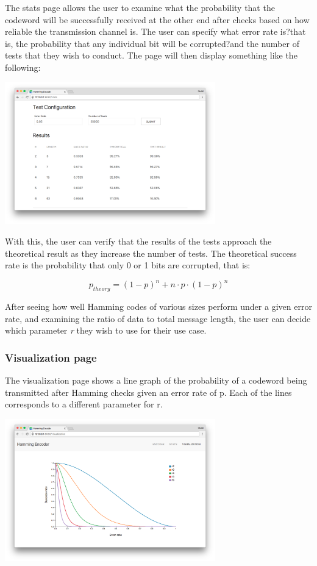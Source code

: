 \documentclass[11pt, oneside]{article}   	%
\begin{document}
The stats page allows the user to examine what the probability that the codeword will be successfully received at the other end after checks based on how reliable the transmission channel is. The user can specify what error rate is?that is, the probability that any individual bit will be corrupted?and the number of tests that they wish to conduct. The page will then display something like the following:

\begin{center}
\includegraphics[width=345px]{stats2}
\end{center}

With this, the user can verify that the results of the tests approach the theoretical result as they increase the number of tests. The theoretical success rate is the probability that only 0 or 1 bits are corrupted, that is:

$$
p_{theory} = (1-p)^n + n \cdot p \cdot (1-p)^n
$$

After seeing how well Hamming codes of various sizes perform under a given error rate, and examining the ratio of data to total message length, the user can decide which parameter \textit{r} they wish to use for their use case. 

\subsubsection*{Visualization page}

The visualization page shows a line graph of the probability of a codeword being transmitted after Hamming checks given an error rate of p. Each of the lines corresponds to a different parameter for r. 

\begin{center}
\includegraphics[width=345px]{vis1}
\end{center}
\end{document}
